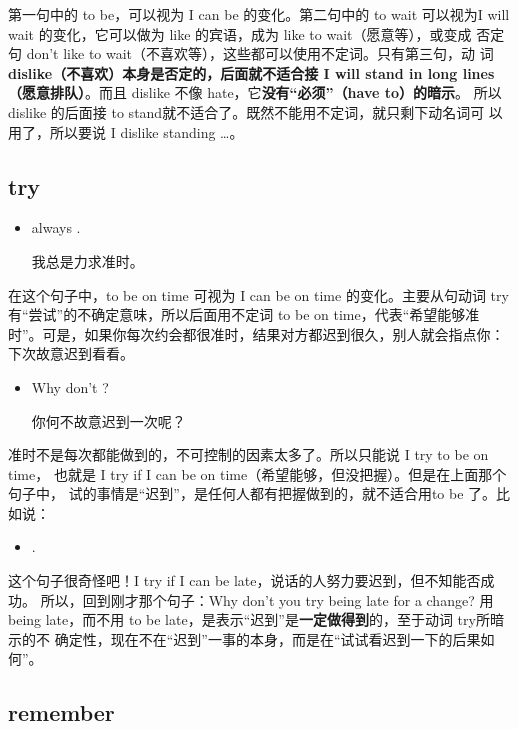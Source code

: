 第一句中的 to be，可以视为 I can be 的变化。第二句中的 to wait 可以视为I
will wait 的变化，它可以做为 like 的宾语，成为 like to wait（愿意等），或变成
否定句 don't like to wait（不喜欢等），这些都可以使用不定词。只有第三句，动
词\textbf{dislike（不喜欢）本身是否定的，后面就不适合接 I will stand in long
  lines（愿意排队）}。而且 dislike 不像 hate，它\textbf{没有“必须”（have to）的暗示}。
所以 dislike 的后面接 to stand就不适合了。既然不能用不定词，就只剩下动名词可
以用了，所以要说 I dislike standing \ldots。

\subsection{try}

\begin{itemize}
\item  {} always  .

  我总是力求准时。
\end{itemize}

在这个句子中，to be on time 可视为 I can be on time 的变化。主要从句动词
try 有“尝试”的不确定意味，所以后面用不定词 to be on
time，代表“希望能够准时”。可是，如果你每次约会都很准时，结果对方都迟到很久，别人就会指点你：下次故意迟到看看。

\begin{itemize}
\item  Why don't   ?

  你何不故意迟到一次呢？
\end{itemize}

准时不是每次都能做到的，不可控制的因素太多了。所以只能说 I try to be on time，
也就是 I try if I can be on time（希望能够，但没把握）。但是在上面那个句子中，
试的事情是“迟到”，是任何人都有把握做到的，就不适合用to be 了。比如说：

\begin{itemize}
\item {}  .
\end{itemize}

这个句子很奇怪吧！I try if I can be late，说话的人努力要迟到，但不知能否成功。
所以，回到刚才那个句子：Why don't you try being late for a change? 用 being
late，而不用 to be late，是表示“迟到”是\textbf{一定做得到}的，至于动词 try所暗示的不
确定性，现在不在“迟到”一事的本身，而是在“试试看迟到一下的后果如何”。

\subsection{remember}

